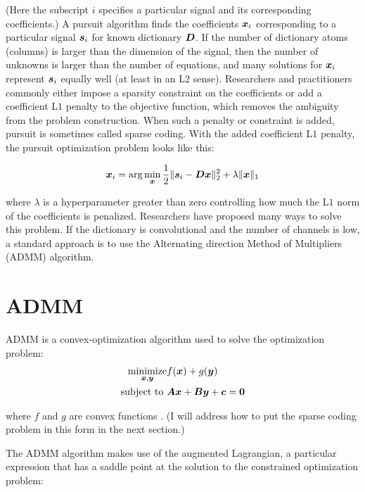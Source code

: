 (Here the subscript $i$ specifies a particular signal and its corresponding coefficients.) A pursuit algorithm finds the coefficients $\bm{x}_i$ corresponding to a particular signal $\bm{s}_i$ for known dictionary $\bm{D}$. If the number of dictionary atoms (columns) is larger than the dimension of the signal, then the number of unknowns is larger than the number of equations, and many solutions for $\bm{x}_i$ represent $\bm{s}_i$ equally well (at least in an L$2$ sense). Researchers and practitioners commonly either impose a sparsity constraint on the coefficients or add a coefficient L$1$ penalty to the objective function, which removes the ambiguity from the problem construction. When such a penalty or constraint is added, pursuit is sometimes called sparse coding. With the added coefficient L$1$ penalty, the pursuit optimization problem looks like this:

\begin{equation}\label{equation:sparse coding}
\bm{x}_i = \arg\min_{\bm{x}} \frac{1}{2}\|\bm{s}_i - \bm{D}\bm{x}\|_2^2 + \lambda \|\bm{x}\|_1
\end{equation}

where $\lambda$ is a hyperparameter greater than zero controlling how much the L$1$ norm of the coefficients is penalized. Researchers have proposed many ways to solve this problem. If the dictionary is convolutional and the number of channels is low, a standard approach is to use the Alternating direction Method of Multipliers (ADMM) algorithm.

\section{ADMM}
ADMM is a convex-optimization algorithm used to solve the optimization problem:
\begin{equation} \label{equation:ADMM}
\begin{aligned}
\operatorname*{\text{minimize}}_{\bm{x},\bm{y}} & f(\bm{x}) + g(\bm{y}) \\
\text{subject to } & \bm{A}\bm{x} + \bm{B}\bm{y} + \bm{c} = \bm{0} 
\end{aligned}
\end{equation}

where $f$ and $g$ are convex functions \cite{boyd2011distributed}. (I will address how to put the sparse coding problem in this form in the next section.)

The ADMM algorithm makes use of the augmented Lagrangian, a particular expression that has a saddle point at the solution to the constrained optimization problem:

